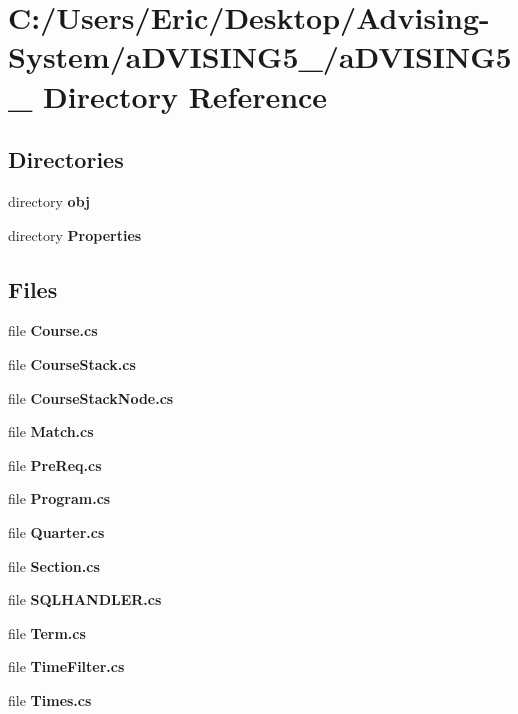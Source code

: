 \section{C\+:/\+Users/\+Eric/\+Desktop/\+Advising-\/\+System/a\+D\+V\+I\+S\+I\+N\+G5\+\_/a\+D\+V\+I\+S\+I\+N\+G5\+\_ Directory Reference}
\label{dir_a3c19ba2fa4cfb74178b8eb3a5a55584}
\subsection*{Directories}
\begin{DoxyCompactItemize}
\item 
directory {\bf obj}
\item 
directory {\bf Properties}
\end{DoxyCompactItemize}
\subsection*{Files}
\begin{DoxyCompactItemize}
\item 
file {\bf Course.\+cs}
\item 
file {\bf Course\+Stack.\+cs}
\item 
file {\bf Course\+Stack\+Node.\+cs}
\item 
file {\bf Match.\+cs}
\item 
file {\bf Pre\+Req.\+cs}
\item 
file {\bf Program.\+cs}
\item 
file {\bf Quarter.\+cs}
\item 
file {\bf Section.\+cs}
\item 
file {\bf S\+Q\+L\+H\+A\+N\+D\+L\+E\+R.\+cs}
\item 
file {\bf Term.\+cs}
\item 
file {\bf Time\+Filter.\+cs}
\item 
file {\bf Times.\+cs}
\end{DoxyCompactItemize}
